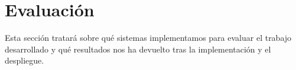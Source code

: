 \chapter{Evaluación}
\label{cap:evaluacion}

Esta sección tratará sobre qué sistemas implementamos para evaluar el trabajo desarrollado y qué resultados nos ha devuelto tras la implementación y el despliegue.